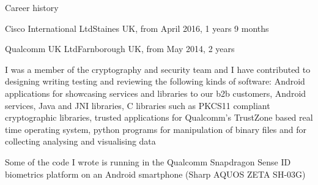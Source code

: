 \documentclass{resume}
\begin{document}
\begin{rSection}{Career history}
\begin{rSubsection}{Cisco International Ltd}{Staines UK, from April 2016, 1 years 9 months}{}{}
        \end{rSubsection}

        \begin{rSubsection}{Qualcomm UK Ltd}{Farnborough UK, from May 2014, 2 years}{}{}
            \item[]
            I was a member of the cryptography and security team and I have contributed to designing writing testing and reviewing the following kinds of software:
            Android applications for showcasing services and libraries to our b2b customers,
            Android services,
            Java and JNI libraries,
            C libraries such as PKCS11 compliant cryptographic libraries,
            trusted applications for Qualcomm's TrustZone based real time operating system,
            python programs for manipulation of binary files and for collecting analysing and visualising data




            \item[]
            Some of the code I wrote is running in the Qualcomm Snapdragon Sense ID biometrics platform on
            an Android smartphone (Sharp AQUOS ZETA SH-03G)
        \end{rSubsection}


\end{rSection}
\end{document}

